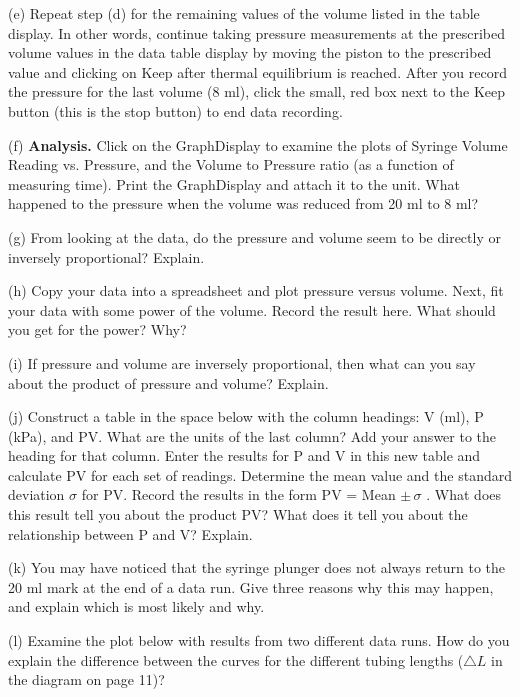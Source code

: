 (e) Repeat step (d) for the remaining values of the volume listed in the table
display. In other words, continue taking pressure measurements at the prescribed
volume values in the data table display by moving the piston to the prescribed
value and clicking on Keep after thermal equilibrium is reached. After you record
the pressure for the last volume (8 ml), click the small, red box next to the
Keep button (this is the stop button) to end data recording.

(f) \textbf{Analysis.} Click on the GraphDisplay to examine the plots of Syringe
Volume Reading vs. Pressure, and the Volume to Pressure ratio (as a function
of measuring time). Print the GraphDisplay and attach it to the unit. What happened
to the pressure when the volume was reduced from 20 ml to 8 ml? 
\vspace{25mm}

(g) From looking at the data, do the pressure and volume seem to be directly
or inversely proportional? Explain. 
\vspace{25mm}

(h) Copy your data into a spreadsheet and plot pressure versus volume. Next, fit your data 
with some power of the volume. Record the result here.
What should you get for the power? Why?
\vspace{35mm}

(i) If pressure and volume are inversely proportional, then what can you say
about the product of pressure and volume? Explain.
\vspace{35mm}

(j) Construct a table in the space below with the column headings: V (ml), P
(kPa), and PV. What are the units of the last column? Add your answer to the heading
for that column. Enter the results for P and V in this new table and calculate
PV for each set of readings. Determine the mean value and the standard deviation
\( \sigma  \) for PV. Record the results in the form PV = Mean \( \pm \, \sigma  \)
. What does this result tell you about the product PV? What does it tell you
about the relationship between P and V? Explain.
\vspace{75mm}

(k) You may have noticed that the syringe plunger does not always return to
the 20 ml mark at the end of a data run. Give three reasons why this may happen,
and explain which is most likely and why. 
\vspace{35mm}

(l) Examine the plot below with results from two different data runs. How do
you explain the difference between the curves for the different tubing lengths
(\( \triangle L \) in the diagram on page 11)?

